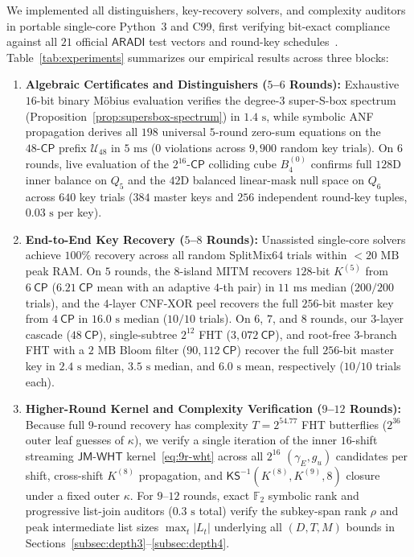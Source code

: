 \documentclass[11pt,a4paper]{article}
\theoremstyle{definition}
\theoremstyle{remark}
\newcommand{\Ftwo}{\mathbb{F}_2}
\newcommand{\ARADI}{\mathsf{ARADI}}
\newcommand{\CP}{\mathsf{CP}}
\begin{document}
We implemented all distinguishers, key-recovery solvers, and complexity auditors in portable single-core Python~3 and C99, first verifying bit-exact compliance against all $21$ official $\ARADI$ test vectors and round-key schedules~\cite{GMW24}. Table~\ref{tab:experiments} summarizes our empirical results across three blocks:
\begin{enumerate}[leftmargin=1.8em]
    \item \textbf{Algebraic Certificates and Distinguishers ($5$--$6$ Rounds):} Exhaustive $16$-bit binary M\"{o}bius evaluation verifies the degree-$3$ super-S-box spectrum (Proposition~\ref{prop:supersbox-spectrum}) in $1.4\text{ s}$, while symbolic ANF propagation derives all $198$ universal $5$-round zero-sum equations on the $48\text{-}\CP$ prefix $\mathcal{U}_{48}$ in $5\text{ ms}$ ($0$ violations across $9{,}900$ random key trials). On $6$ rounds, live evaluation of the $2^{16}\text{-}\CP$ colliding cube $B_4^{(0)}$ confirms full $128$D inner balance on $Q_5$ and the $42$D balanced linear-mask null space on $Q_6$ across $640$ key trials ($384$ master keys and $256$ independent round-key tuples, $0.03\text{ s}$ per key).
    \item \textbf{End-to-End Key Recovery ($5$--$8$ Rounds):} Unassisted single-core solvers achieve $100\%$ recovery across all random SplitMix64 trials within $<20\text{ MB}$ peak RAM. On $5$ rounds, the $8$-island MITM recovers $128$-bit $K^{(5)}$ from $6~\CP$ ($6.21~\CP$ mean with an adaptive $4$-th pair) in $11\text{ ms}$ median ($200/200$ trials), and the $4$-layer CNF-XOR peel recovers the full $256$-bit master key from $4~\CP$ in $16.0\text{ s}$ median ($10/10$ trials). On $6$, $7$, and $8$ rounds, our $3$-layer cascade ($48~\CP$), single-subtree $2^{12}$ FHT ($3{,}072~\CP$), and root-free $3$-branch FHT with a $2\text{ MB}$ Bloom filter ($90{,}112~\CP$) recover the full $256$-bit master key in $2.4\text{ s}$ median, $3.5\text{ s}$ median, and $6.0\text{ s}$ mean, respectively ($10/10$ trials each).
    \item \textbf{Higher-Round Kernel and Complexity Verification ($9$--$12$ Rounds):} Because full $9$-round recovery has complexity $T = 2^{54.77}$ FHT butterflies ($2^{36}$ outer leaf guesses of $\kappa$), we verify a single iteration of the inner $16$-shift streaming $\mathsf{JM\text{-}WHT}$ kernel~\eqref{eq:9r-wht} across all $2^{16}$ $(\gamma_E, g_u)$ candidates per shift, cross-shift $K^{(8)}$ propagation, and $\mathsf{KS}^{-1}(K^{(8)}, K^{(9)}, 8)$ closure under a fixed outer $\kappa$. For $9$--$12$ rounds, exact $\Ftwo$ symbolic rank and progressive list-join auditors ($0.3\text{ s}$ total) verify the subkey-span rank $\rho$ and peak intermediate list sizes $\max_t |L_t|$ underlying all $(D, T, M)$ bounds in Sections~\ref{subsec:depth3}--\ref{subsec:depth4}.
\end{enumerate}
\end{document}
